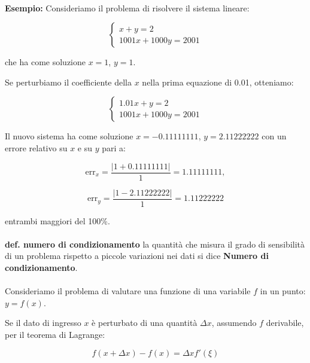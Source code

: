 \documentclass[a4paper, 11pt]{article}
\begin{document}
        \paragraph{}
        \textbf{Esempio: }
        Consideriamo il problema di risolvere il sistema lineare:

        \[
            \begin{cases}
            x + y = 2 \\
            1001x + 1000y = 2001
            \end{cases}
        \]

        che ha come soluzione \( x = 1 \), \( y = 1 \).

        Se perturbiamo il coefficiente della \( x \) nella prima equazione di 0.01, otteniamo:

        \[
            \begin{cases}
            1.01x + y = 2 \\
            1001x + 1000y = 2001
            \end{cases}
        \]

        Il nuovo sistema ha come soluzione \( x = -0.11111111 \), \( y = 2.11222222 \) con un errore relativo su \( x \) e su \( y \) pari a:

        \[
            \text{err}_x = \frac{|1 + 0.11111111|}{1} = 1.11111111,
        \]

        \[
            \text{err}_y = \frac{|1 - 2.11222222|}{1} = 1.11222222
        \]

        entrambi maggiori del 100\%.


        \paragraph{}
        \textbf{def. numero di condizionamento } la quantità che misura il grado di sensibilità di un problema rispetto a piccole variazioni nei dati si dice \textbf{Numero di condizionamento}.

        \paragraph{}
        Consideriamo il problema di valutare una funzione di una variabile \( f \) in un punto: \( y = f(x) \).

        Se il dato di ingresso \( x \) è perturbato di una quantità \( \Delta x \), assumendo \( f \) derivabile, per il teorema di Lagrange:

        \[
            f(x + \Delta x) - f(x) = \Delta x f'(\xi)
        \]
\end{document}
